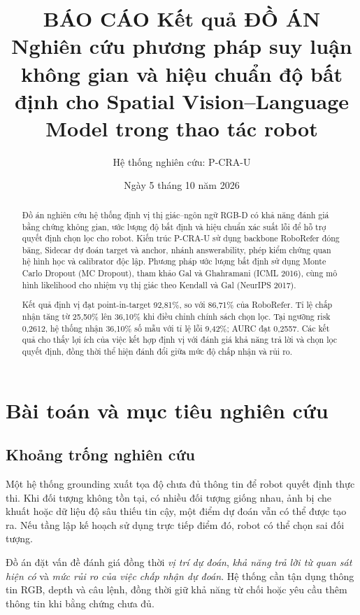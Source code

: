 \documentclass[12pt,a4paper]{article}
\title{\textbf{BÁO CÁO Kết quả  ĐỒ ÁN}\\[0.7em]
\large Nghiên cứu phương pháp suy luận không gian và hiệu chuẩn độ bất định cho Spatial Vision--Language Model trong thao tác robot}
\author{Hệ thống nghiên cứu: P-CRA-U}
\date{Ngày 5 tháng 10 năm 2026}
\begin{document}
\maketitle
\begin{abstract}
Đồ án nghiên cứu hệ thống định vị thị giác--ngôn ngữ RGB-D có khả năng đánh giá bằng chứng không gian, ước lượng độ bất định và hiệu chuẩn xác suất lỗi để hỗ trợ quyết định chọn lọc cho robot. Kiến trúc P-CRA-U sử dụng backbone RoboRefer đóng băng, Sidecar dự đoán target và anchor, nhánh answerability, phép kiểm chứng quan hệ hình học và calibrator độc lập. Phương pháp ước lượng bất định sử dụng Monte Carlo Dropout (MC Dropout), tham khảo Gal và Ghahramani (ICML 2016), cùng mô hình likelihood cho nhiệm vụ thị giác theo Kendall và Gal (NeurIPS 2017).

Kết quả định vị đạt point-in-target 92,81\%, so với 86,71\% của RoboRefer. Tỉ lệ chấp nhận tăng từ 25,50\% lên 36,10\% khi điều chỉnh chính sách chọn lọc. Tại ngưỡng risk 0,2612, hệ thống nhận 36,10\% số mẫu với tỉ lệ lỗi 9,42\%; AURC đạt 0,2557. Các kết quả cho thấy lợi ích của việc kết hợp định vị với đánh giá khả năng trả lời và chọn lọc quyết định, đồng thời thể hiện đánh đổi giữa mức độ chấp nhận và rủi ro.
\end{abstract}
\tableofcontents
\clearpage

\section{Bài toán và mục tiêu nghiên cứu}
\subsection{Khoảng trống nghiên cứu}
Một hệ thống grounding xuất tọa độ chưa đủ thông tin để robot quyết định thực thi. Khi đối tượng không tồn tại, có nhiều đối tượng giống nhau, ảnh bị che khuất hoặc dữ liệu độ sâu thiếu tin cậy, một điểm dự đoán vẫn có thể được tạo ra. Nếu tầng lập kế hoạch sử dụng trực tiếp điểm đó, robot có thể chọn sai đối tượng.

Đồ án đặt vấn đề đánh giá đồng thời \emph{vị trí dự đoán}, \emph{khả năng trả lời từ quan sát hiện có} và \emph{mức rủi ro của việc chấp nhận dự đoán}. Hệ thống cần tận dụng thông tin RGB, depth và câu lệnh, đồng thời giữ khả năng từ chối hoặc yêu cầu thêm thông tin khi bằng chứng chưa đủ.
\end{document}
